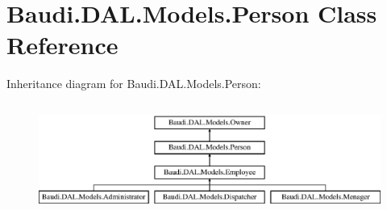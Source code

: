 \hypertarget{class_baudi_1_1_d_a_l_1_1_models_1_1_person}{}\section{Baudi.\+D\+A\+L.\+Models.\+Person Class Reference}
\label{class_baudi_1_1_d_a_l_1_1_models_1_1_person}
Inheritance diagram for Baudi.\+D\+A\+L.\+Models.\+Person\+:\begin{figure}[H]
\begin{center}
\leavevmode
\includegraphics[height=3.660131cm]{class_baudi_1_1_d_a_l_1_1_models_1_1_person}
\end{center}
\end{figure}
